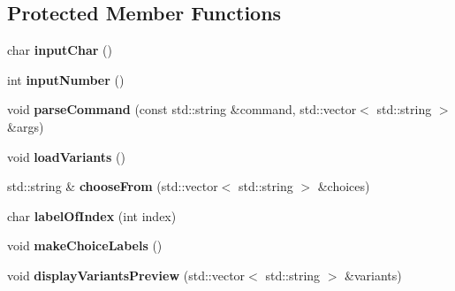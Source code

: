 \subsection*{Protected Member Functions}
\begin{DoxyCompactItemize}
\item 
char {\bfseries input\+Char} ()\hypertarget{classMenu_a63f7d79414924fa83dceeb160cb3f615}{}\label{classMenu_a63f7d79414924fa83dceeb160cb3f615}

\item 
int {\bfseries input\+Number} ()\hypertarget{classMenu_a8cf9c74ebfcca2a689f9930b238d8633}{}\label{classMenu_a8cf9c74ebfcca2a689f9930b238d8633}

\item 
void {\bfseries parse\+Command} (const std\+::string \&command, std\+::vector$<$ std\+::string $>$ \&args)\hypertarget{classMenu_a4a68d5462687cb599e35b63ae38e7b88}{}\label{classMenu_a4a68d5462687cb599e35b63ae38e7b88}

\item 
void {\bfseries load\+Variants} ()\hypertarget{classMenu_a31523662e2b9d252716aa92cd0de4fa8}{}\label{classMenu_a31523662e2b9d252716aa92cd0de4fa8}

\item 
std\+::string \& {\bfseries choose\+From} (std\+::vector$<$ std\+::string $>$ \&choices)\hypertarget{classMenu_ac3405aa5b352ac8703b9ffa96c491863}{}\label{classMenu_ac3405aa5b352ac8703b9ffa96c491863}

\item 
char {\bfseries label\+Of\+Index} (int index)\hypertarget{classMenu_aef05b36518c368c8cc09fe8b7f936d45}{}\label{classMenu_aef05b36518c368c8cc09fe8b7f936d45}

\item 
void {\bfseries make\+Choice\+Labels} ()\hypertarget{classMenu_a48c9d012d1929fd523231a2fcba114a9}{}\label{classMenu_a48c9d012d1929fd523231a2fcba114a9}

\item 
void {\bfseries display\+Variants\+Preview} (std\+::vector$<$ std\+::string $>$ \&variants)\hypertarget{classMenu_aef06601147fe4e258b855b3e9df9e165}{}\label{classMenu_aef06601147fe4e258b855b3e9df9e165}

\end{DoxyCompactItemize}

